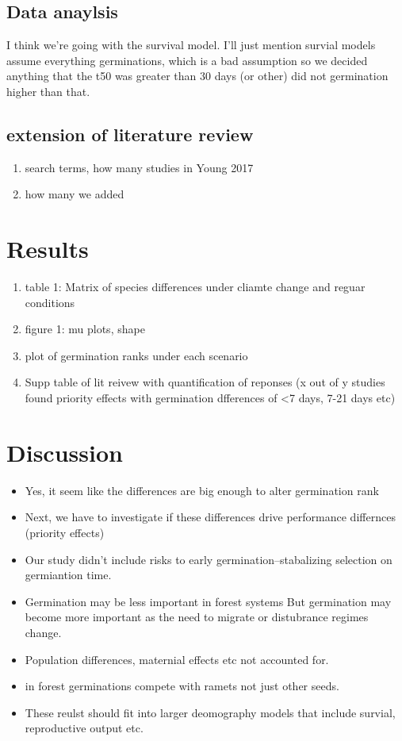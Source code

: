 \documentclass{article}\usepackage[]{graphicx}\usepackage[]{color}
\begin{document}
\subsection{Data anaylsis}
I think we're going with the survival model. I'll just mention survial models assume everything germinations, which is a bad assumption so we decided anything that the t50 was greater than 30 days (or other) did not germination higher than that.

\subsection{extension of literature review}
\begin{enumerate}
\item search terms, how many studies in Young 2017
\item how many we added
\end{enumerate}

\section*{Results}
\begin{enumerate}
\item table 1: Matrix of species differences under cliamte change and reguar conditions
\item figure 1: mu plots, shape
\item plot of germination ranks under each scenario
\item Supp table of lit reivew with quantification of reponses (x out of y studies found priority effects with germination dfferences of <7 days, 7-21 days etc)
\end{enumerate}


\section*{Discussion}
\begin{itemize}
\item Yes, it seem like the differences are big enough to alter germination rank
\item Next, we have to investigate if these differences drive performance differnces (priority effects)
\item Our study didn't include risks to early germination--stabalizing selection on germiantion time.
\item Germination may be less important in forest systems But germination may become more important as the need to migrate or distubrance regimes change.
\item Population differences, maternial effects etc not accounted for.
\item in forest germinations compete with ramets not just other seeds.
\item These reulst should fit into larger deomography models that include survial, reproductive output etc.
\end{itemize}
\end{document}
